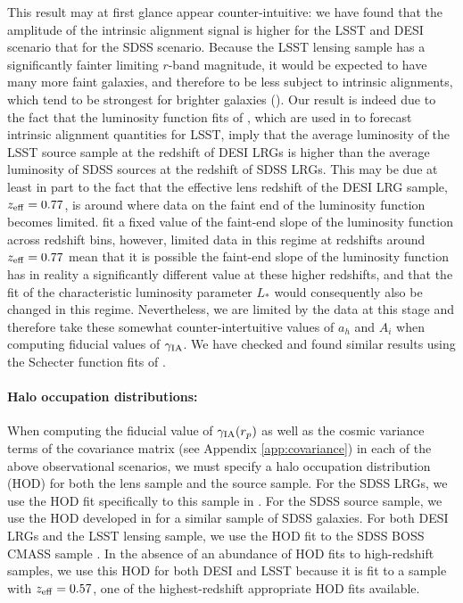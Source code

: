 \documentclass[a4paper,fleqn,usenatbib]{mnras}
\begin{document}
This result may at first glance appear counter-intuitive: we have found that the amplitude of the intrinsic alignment signal is higher for the LSST and DESI scenario that for the SDSS scenario. Because the LSST lensing sample has a significantly fainter limiting $r$-band magnitude, it would be expected to have many more faint galaxies, and therefore to be less subject to intrinsic alignments, which tend to be strongest for brighter galaxies (\cite{xx}). Our result is indeed due to the fact that the luminosity function fits of \cite{Loveday2012}, which are used in \cite{Krause2015} to forecast intrinsic alignment quantities for LSST, imply that the average luminosity of the LSST source sample at the redshift of DESI LRGs is higher than the average luminosity of SDSS sources at the redshift of SDSS LRGs. This may be due at least in part to the fact that the effective lens redshift of the DESI LRG sample, $z_{\rm eff}=0.77$, is around where data on the faint end of the luminosity function becomes limited. \cite{Loveday2012} fit a fixed value of the faint-end slope of the luminosity function across redshift bins, however, limited data in this regime at redshifts around $z_{\rm eff}=0.77$ mean that it is possible the faint-end slope of the luminosity function has in reality a significantly different value at these higher redshifts, and that the fit of the characteristic luminosity parameter $L_*$ would consequently also be changed in this regime. Nevertheless, we are limited by the data at this stage and therefore take these somewhat counter-intertuitive values of $a_h$ and $A_i$ when computing fiducial values of $\gamma_{\rm IA}$. We have checked and found similar results using the Schecter function fits of \cite{Faber2007}.

\paragraph*{Halo occupation distributions:} When computing the fiducial value of $\gamma_{\rm IA}(r_p)$ as well as the cosmic variance terms of the covariance matrix (see Appendix \ref{app:covariance}) in each of the above observational scenarios, we must specify a halo occupation distribution (HOD) for both the lens sample and the source sample. For the SDSS LRGs, we use the HOD fit specifically to this sample in \cite{Reid2009}. For the SDSS source sample, we use the HOD developed in \cite{Zu2015} for a similar sample of SDSS galaxies. For both DESI LRGs and the LSST lensing sample, we use the HOD fit to the SDSS BOSS CMASS sample \cite{More2015}. In the absence of an abundance of HOD fits to high-redshift samples, we use this HOD for both DESI and LSST because it is fit to a sample with $z_{\rm eff}=0.57$, one of the highest-redshift appropriate HOD fits available.
\end{document}
